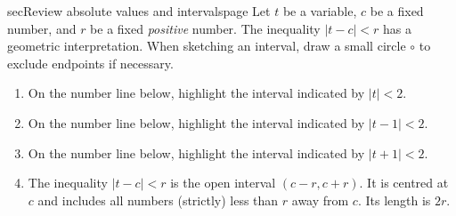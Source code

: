 \documentclass[../main.tex]{subfiles}
\begin{document}
\begin{outline}{sec}{Review absolute values and intervals}{page}
  Let \(t\) be a variable, \(c\) be a fixed number, and \(r\) be a fixed \emph{positive} number. The inequality \(|t - c| < r\) has a geometric interpretation. When sketching an interval, draw a small circle \(\circ\) to exclude endpoints if necessary.
  \begin{enumerate}
    \item On the number line below, highlight the interval indicated by \(|t| < 2\).
          \begin{center}
          \end{center}

    \item On the number line below, highlight the interval indicated by \(|t - 1| < 2\).
          \begin{center}
          \end{center}

    \item On the number line below, highlight the interval indicated by \(|t + 1| < 2\).
          \begin{center}
          \end{center}
    \item The inequality \(|t - c| < r\) is the open interval \((c - r, c + r)\). It is centred at \(c\) and includes all numbers (strictly) less than \(r\) away from \(c\). Its length is \(2r\).
  \end{enumerate}
\end{outline}
\end{document}
